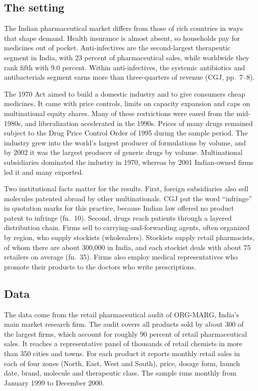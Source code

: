 \subsection{The setting}\label{sec:05-cgj-setting}

The Indian pharmaceutical market differs from those of rich countries in ways that shape demand. Health insurance is
almost absent, so households pay for medicines out of pocket. Anti-infectives are the second-largest therapeutic
segment in India, with 23 percent of pharmaceutical sales, while worldwide they rank fifth with 9.0 percent. Within
anti-infectives, the systemic antibiotics and antibacterials segment earns more than three-quarters of revenue
(CGJ, pp.~7--8).

The 1970 Act aimed to build a domestic industry and to give consumers cheap medicines. It came with price controls,
limits on capacity expansion and caps on multinational equity shares. Many of these restrictions were eased from the
mid-1980s, and liberalization accelerated in the 1990s. Prices of many drugs remained subject to the Drug Price
Control Order of 1995 during the sample period. The industry grew into the world's largest producer of formulations
by volume, and by 2002 it was the largest producer of generic drugs by volume. Multinational subsidiaries dominated
the industry in 1970, whereas by 2001 Indian-owned firms led it and many exported.

Two institutional facts matter for the results. First, foreign subsidiaries also sell molecules patented abroad by
other multinationals. CGJ put the word ``infringe'' in quotation marks for this practice, because Indian law offered
no product patent to infringe (fn.~10). Second, drugs reach patients through a layered distribution chain. Firms sell
to carrying-and-forwarding agents, often organized by region, who supply stockists (wholesalers). Stockists supply
retail pharmacists, of whom there are about 300,000 in India, and each stockist deals with about 75 retailers on
average (fn.~35). Firms also employ medical representatives who promote their products to the doctors who write
prescriptions.

\subsection{Data}\label{sec:05-cgj-data}

The data come from the retail pharmaceutical audit of ORG-MARG, India's main market research firm. The audit covers
all products sold by about 300 of the largest firms, which account for roughly 90 percent of retail pharmaceutical
sales. It reaches a representative panel of thousands of retail chemists in more than 350 cities and towns. For each
product it reports monthly retail sales in each of four zones (North, East, West and South), price, dosage form,
launch date, brand, molecule and therapeutic class. The sample runs monthly from January 1999 to December 2000.


